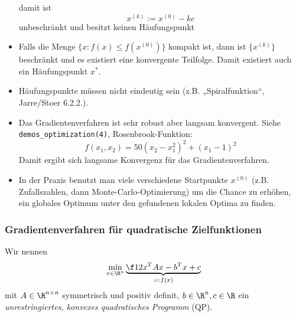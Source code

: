 \documentclass[11pt]{scrartcl}
\begin{document}
\begin{st}[Konvergenz]
\begin{note}
\begin{itemize}
\[				\]
				damit ist
				\[
					x^{(k)} := x^{(0)} - k c
				\]
				unbeschränkt und besitzt keinen Häufungspunkt
			\item
				Falls die Menge $\{x : f(x) \le f(x^{(0)}) \}$ kompakt ist, dann ist $\{x^{(k)}\}$ beschränkt und es existiert eine konvergente Teilfolge.
				Damit existiert auch ein Häufungspunkt $x^*$.
			\item
				Häufungspunkte müssen nicht eindeutig sein (z.B. „Spiralfunktion“, Jarre/Stoer 6.2.2.).
			\item
				Das Gradientenverfahren ist sehr robust aber langsam konvergent.
				Siehe \verb|demos_optimization(4)|, Rosenbrook-Funktion:
				\[
					f(x_1, x_2) = 50 (x_2-x_1^2)^2 + (x_1-1)^2
				\]
				Damit ergibt sich langsame Konvergenz für das Gradientenverfahren.
			\item
				In der Praxis benutzt man viele verschiedene Startpunkte $x^{(0)}$ (z.B. Zufallszahlen, dann Monte-Carlo-Optimierung) um die Chance zu erhöhen, ein globales Optimum unter den gefundenen lokalen Optima zu finden.
		 \end{itemize}
	 \end{note}
\end{st}


\subsubsection{Gradientenverfahren für quadratische Zielfunktionen}


\begin{df}[Unrestringiertes QP] \label{4.9}
	Wir nennen
	\[
		\min_{x\in \R^n} \underbrace{\f 12 x^T A x - b^T x + c}_{=:f(x)}
	\]
	mit $A \in \R^{n\times n}$ symmetrisch und positiv definit, $b\in \R^n, c\in \R$ ein
	\emph{unrestringiertes, konvexes quadratisches Programm} (QP).
\end{df}
\end{document}
